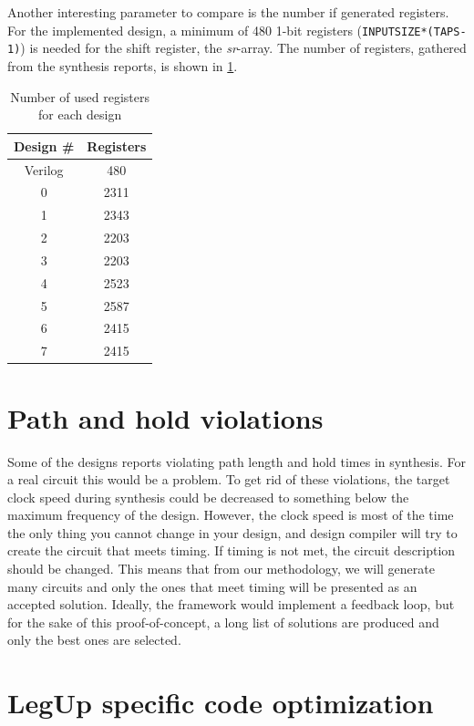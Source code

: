 Another interesting parameter to compare is the number if generated registers. For the implemented design, a minimum of 480 1-bit registers (\verb!INPUTSIZE*(TAPS-1)!) is needed for the shift register, the \textit{sr}-array. The number of registers, gathered from the synthesis reports, is shown in \cref{tab:resultregistercount}. 

\begin{table}[hbtp]
    \centering
    \begin{tabular}{cc}
    \textbf{Design \#} & \textbf{Registers} \\
    \toprule
    Verilog & 480 \\
    0 & 2311 \\
    1 & 2343 \\
    2 & 2203 \\
    3 & 2203 \\
    4 & 2523 \\
    5 & 2587 \\
    6 & 2415 \\
    7 & 2415 \\
    \bottomrule
    \end{tabular}
    \caption{Number of used registers for each design}
    \label{tab:resultregistercount}
\end{table}

\section{Path and hold violations}
Some of the designs reports violating path length and hold times in synthesis. For a real circuit this would be a problem. To get rid of these violations, the target clock speed during synthesis could be decreased to something below the maximum frequency of the design. However, the clock speed is most of the time the only thing you cannot change in your design, and design compiler will try to create the circuit that meets timing. If timing is not met, the circuit description should be changed. This means that from our methodology, we will generate many circuits and only the ones that meet timing will be presented as an accepted solution. Ideally, the framework would implement a feedback loop, but for the sake of this proof-of-concept, a long list of solutions are produced and only the best ones are selected.

\section{LegUp specific code optimization}

